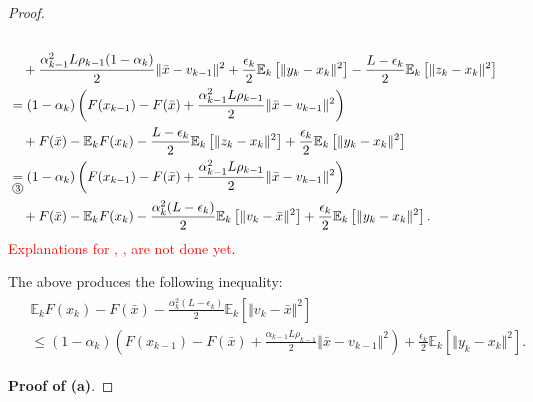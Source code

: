 \documentclass[12pt]{article}
\newcommand{\expect}{\ensuremath{\mathbb E}}
\begin{document}
\begin{proof}
{\begin{align*}
                \\&\quad 
                    + \frac{\alpha_{k - 1}^2L \rho_{k - 1}(1 - \alpha_k)}{2}\Vert \bar x - v_{k - 1}\Vert^2
                    + \frac{\epsilon_k}{2}\expect_k \left[\Vert y_k - x_k \Vert^2\right] 
                    - \frac{L - \epsilon_k}{2}\expect_k \left[\Vert z_k - x_k\Vert^2\right]
                \\&= 
                (1 - \alpha_k)\left(
                    F(x_{k - 1}) - F(\bar x)
                    + \frac{\alpha_{k - 1}^2L\rho_{k - 1}}{2}\Vert \bar x - v_{k - 1}\Vert^2
                \right)
                    \\ &\quad 
                    + F(\bar x) - \expect_kF(x_k) 
                    - \frac{L - \epsilon_k}{2}\expect_k \left[\Vert z_k - x_k\Vert^2\right]
                    + \frac{\epsilon_k}{2}\expect_k \left[\Vert y_k - x_k \Vert^2\right] 
                \\
                &\underset{\circled{3}}{=} 
                (1 - \alpha_k)\left(
                    F(x_{k - 1}) - F(\bar x)
                    + \frac{\alpha_{k - 1}^2L\rho_{k - 1}}{2}\Vert \bar x - v_{k - 1}\Vert^2
                \right)
                    \\ &\quad 
                    + F(\bar x) - \expect_kF(x_k) 
                    - \frac{\alpha_k^2(L - \epsilon_k)}{2}\expect_k \left[\Vert v_k - \bar x\Vert^2\right]
                    + \frac{\epsilon_k}{2}\expect_k \left[\Vert y_k - x_k \Vert^2\right]. 
            \end{align*}
            }
            \textcolor{red}{Explanations for , ,  are not done yet}. 
            \par
            The above produces the following inequality: 
            \begin{align}\begin{split}
                & \expect_kF(x_k) - F(\bar x) - \frac{\alpha_k^2(L - \epsilon_k)}{2}\expect_k \left[\Vert v_k - \bar x\Vert^2\right]
                \\
                &\le 
                (1 - \alpha_k)\left(
                    F(x_{k - 1}) - F(\bar x)
                    + \frac{\alpha_{k - 1}L\rho_{k - 1}}{2}\Vert \bar x - v_{k - 1}\Vert^2
                \right) + \frac{\epsilon_k}{2}\expect_k \left[\Vert y_k - x_k \Vert^2\right]. 
            \end{split}\end{align}
            \par \textbf{Proof of (a)}. 

\end{proof}
\end{document}
